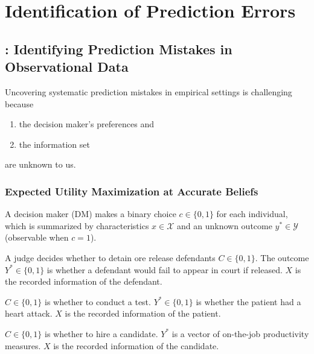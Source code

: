 \chapter{Identification of Prediction Errors}
\section{\cite{rambachan2024identifying}: Identifying Prediction Mistakes in Observational Data}
Uncovering systematic prediction mistakes in empirical settings is challenging because
\begin{enumerate}
    \item the decision maker's preferences and
    \item the information set
\end{enumerate}
are unknown to us.

\subsection{Expected Utility Maximization at Accurate Beliefs}
A decision maker (DM) makes a binary choice $c\in\{0,1\}$ for each individual, which is summarized by characteristics $x\in \mathcal{X}$ and an unknown outcome $y^*\in \mathcal{Y}$ (observable when $c=1$).

\begin{example}
    A judge decides whether to detain ore release defendants $C\in\{0,1\}$. The outcome $Y^*\in\{0,1\}$ is whether a defendant would fail to appear in court if released. $X$ is the recorded information of the defendant.
\end{example}

\begin{example}
    $C\in\{0,1\}$ is whether to conduct a test. $Y^*\in\{0,1\}$ is whether the patient had a heart attack. $X$ is the recorded information of the patient.
\end{example}

\begin{example}[ (Hiring)]
    $C\in\{0,1\}$ is whether to hire a candidate. $Y^*$  is a vector of on-the-job productivity measures. $X$ is the recorded information of the candidate.
\end{example}


